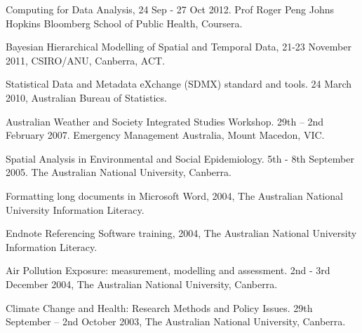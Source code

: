 \documentclass[a4paper,11pt]{article}
\begin{document}
\medskip
\renewcommand{\labelenumi}{\textsc{j}\theenumi.}
\begin{revnumerate}

\item Computing for Data Analysis, 24 Sep - 27 Oct 2012.  Prof Roger Peng Johns Hopkins Bloomberg School of Public Health, Coursera.

\item Bayesian Hierarchical Modelling of Spatial and Temporal Data, 21-23 November 2011, CSIRO/ANU, Canberra, ACT.

\item Statistical Data and Metadata eXchange (SDMX) standard and tools.  24 March 2010, Australian Bureau of Statistics.

\item Australian Weather and Society Integrated Studies Workshop.  29th – 2nd February 2007.  Emergency Management Australia, Mount Macedon, VIC.

\item Spatial Analysis in Environmental and Social Epidemiology.  5th  - 8th  September 2005. The Australian National University, Canberra.

\item Formatting long documents in Microsoft Word, 2004, The Australian National University Information Literacy.

\item Endnote Referencing Software training, 2004, The Australian National University Information Literacy.

\item Air Pollution Exposure: measurement, modelling and assessment.  2nd - 3rd  December 2004, The Australian National University, Canberra. 

\item Climate Change and Health: Research Methods and Policy Issues.  29th September – 2nd  October 2003, The Australian National University, Canberra.
\end{revnumerate}

\bigskip
\end{document}
